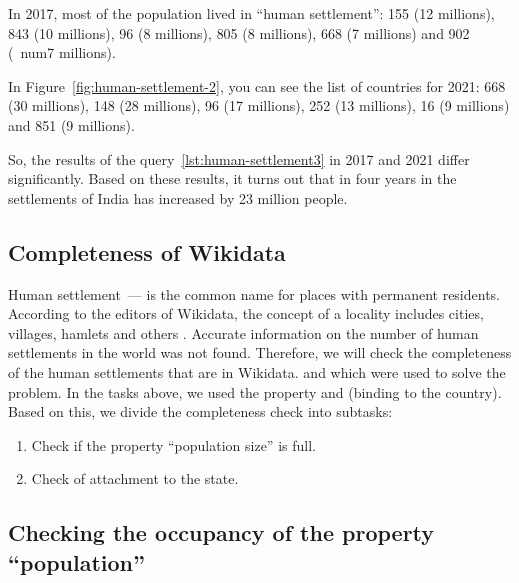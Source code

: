 In 2017, most of the population lived in ``human settlement'':
 {155} (\num {12} millions),
 {843} (\num {10} millions),
 {96} (\num {8} millions),
 {805} (\num {8} millions),
 {668} (\num {7} millions) and
 {902} (\ num{7} millions).

In Figure~\ref{fig:human-settlement-2}, you can see the list of countries for 2021:
 {668} (\num {30} millions),
 {148} (\num {28} millions),
 {96} (\num {17} millions),
 {252} (\num {13} millions),
 {16} (\num {9} millions) and
 {851} (\num {9} millions).

So, the results of the query~\ref{lst:human-settlement3} in 2017 and 2021 differ significantly.
Based on these results, it turns out that in four years
in the settlements of India has increased by 23 million people.

\subsection{Completeness of Wikidata}

Human settlement~--- is the common name for places with permanent residents.
According to the editors of Wikidata, the concept of a locality includes cities, villages, hamlets
and others .
Accurate information on the number of human settlements in the world was not found.
Therefore, we will check the completeness of the human settlements that are in Wikidata.
and which were used to solve the problem.
In the tasks above, we used the  property and
 (binding to the country).
Based on this, we divide the completeness check into subtasks:
\begin {enumerate}
  \item Check if the property ``population size'' is full.
  \item Check of attachment to the state.
\end {enumerate}

\subsection{Checking the occupancy of the property ``population''}

